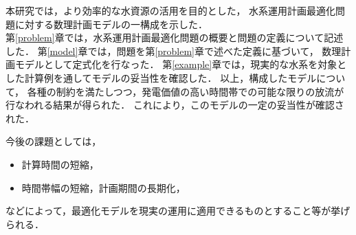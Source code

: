 本研究では，より効率的な水資源の活用を目的とした，%
水系運用計画最適化問題に対する数理計画モデルの一構成を示した．\\
\indent
第\ref{problem}章では，水系運用計画最適化問題の概要と問題の定義について記述した．
第\ref{model}章では，問題を第\ref{problem}章で述べた定義に基づいて，%
数理計画モデルとして定式化を行なった．
第\ref{example}章では，現実的な水系を対象とした計算例を通してモデルの妥当性を確認した．
以上，構成したモデルについて，%
各種の制約を満たしつつ，発電価値の高い時間帯での可能な限りの放流が%
行なわれる結果が得られた．
これにより，このモデルの一定の妥当性が確認された．

今後の課題としては，
\begin{itemize}
	\item
	計算時間の短縮，
	\item
	時間帯幅の短縮，計画期間の長期化，
\end{itemize}
などによって，最適化モデルを現実の運用に適用できるものとすること等が挙げられる．